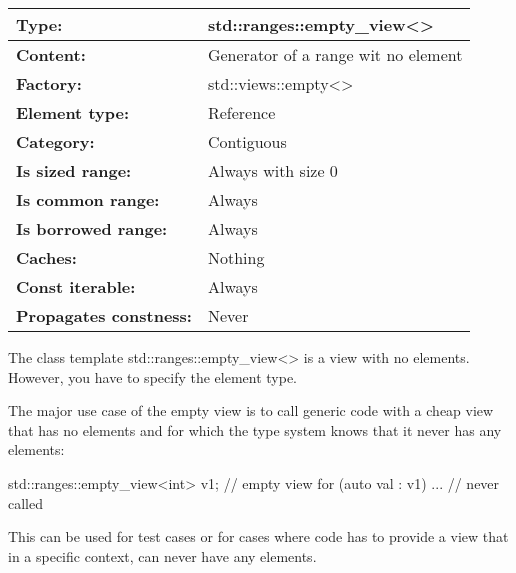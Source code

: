 
\begin{longtable}[c]{|l|l|}
\hline
\textbf{Type:}                 & std::ranges::empty\_view\textless{}\textgreater{} \\ \hline
\endfirsthead
%
\endhead
%
\textbf{Content:}              & Generator of a range wit no element               \\ \hline
\textbf{Factory:}              & std::views::empty\textless{}\textgreater{}        \\ \hline
\textbf{Element type:}         & Reference                                         \\ \hline
\textbf{Category:}             & Contiguous                                        \\ \hline
\textbf{Is sized range:}       & Always with size 0                                \\ \hline
\textbf{Is common range:}      & Always                                            \\ \hline
\textbf{Is borrowed range:}    & Always                                            \\ \hline
\textbf{Caches:}               & Nothing                                           \\ \hline
\textbf{Const iterable:}       & Always                                            \\ \hline
\textbf{Propagates constness:} & Never                                             \\ \hline
\end{longtable}

The class template std::ranges::empty\_view<> is a view with no elements. However, you have to specify the element type.

The major use case of the empty view is to call generic code with a cheap view that has no elements and for which the type system knows that it never has any elements:


\begin{cpp}
std::ranges::empty_view<int> v1; // empty view
for (auto val : v1) {
	... // never called
}
\end{cpp}

This can be used for test cases or for cases where code has to provide a view that in a specific context, can never have any elements.

